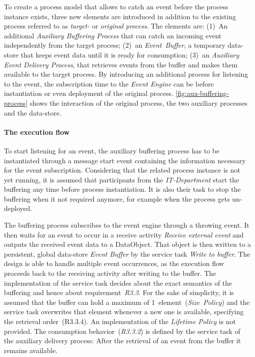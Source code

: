 To create a process model that allows to catch an event before the process instance exists, three new elements are introduced in addition to the existing process referred to as \textit{target-} or \textit{original process}. The elements are: (1)~An additional \textit{Auxiliary Buffering Process} that can catch an incoming event independently from the target process; (2)~an \textit{Event~Buffer}, a temporary data-store that keeps event data until it is ready for consumption; (3)~an \textit{Auxiliary Event Delivery Process}, that retrieves events from the buffer and makes them available to the target process.
By introducing an additional process for listening to the event, the subscription time to the \textit{Event Engine} can be before instantiation or even deployment of the original process.
\autoref{fig:aux-buffering-process} shows the interaction of the original process, the two auxiliary processes and the data-store.

\paragraph{The execution flow}
To start listening for an event, the auxiliary buffering process has to be instantiated through a message start event containing the information necessary for the event subscription. Considering that the related process instance is not yet running, it is assumed that participants from the \textit{IT-Department} start the buffering any time before process instantiation.
It is also their task to stop the buffering when it not required anymore, for example when the process gets un-deployed.

The buffering process subscribes to the event engine through a throwing event. It then waits for an event to occur in a receive activity \textit{Receive external event} and outputs the received event data to a DataObject. That object is then written to a persistent, global data-store \textit{Event Buffer} by the service task \textit{Write to buffer}. 
The design is able to handle multiple event occurrences, as the execution flow proceeds back to the receiving activity after writing to the buffer.
The implementation of the service task decides about the exact semantics of the buffering and hence about requirement~\textit{R3.3}. For the sake of simplicity, it is assumed that the buffer can hold a maximum of 1~element~(\textit{Size~Policy}) and the service task overwrites that element whenever a new one is available, specifying the retrieval order~(R3.3.4).
An implementation of the \textit{Lifetime Policy} is not provided. 
The consumption behavior~(\textit{R3.3.2}) is defined by the service task of the auxiliary delivery process: After the retrieval of an event from the buffer it remains available.

